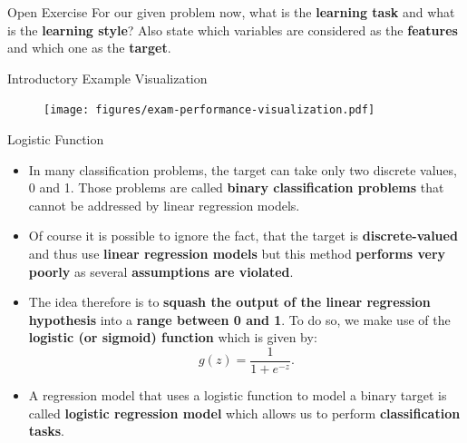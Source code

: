 \documentclass[main.tex]{subfiles}
\begin{document}
    \begin{frame}{Open Exercise }
        For our given problem now, what is the \textbf{learning task} and what is the \textbf{learning style}? Also state which variables are considered as the \textbf{features} and which one as the \textbf{target}.
        
    \end{frame}

    \begin{frame}{Introductory Example Visualization}
        \begin{figure}
            \label{fig:exam-performance-visualization}
            \texttt{[image: figures/exam-performance-visualization.pdf]}
        \end{figure}
    \end{frame}

	\begin{frame}{Logistic Function}
        \begin{itemize}
            \item In many classification problems, the target can take only two discrete values, 0 and 1. Those problems are called \textbf{binary classification problems} that cannot be addressed by linear regression models.
            \item Of course it is possible to ignore the fact, that the target is \textbf{discrete-valued} and thus use \textbf{linear regression models} but this method \textbf{performs very poorly} as several \textbf{assumptions are violated}.
            \item The idea therefore is to \textbf{squash the output of the linear regression hypothesis} into a \textbf{range between 0 and 1}. To do so, we make use of the \textbf{logistic (or sigmoid) function} which is given by:
            $$g(z) = \frac{1}{1 + e^{-z}}.$$
            \item A regression model that uses a logistic function to model a binary target is called \textbf{logistic regression model} which allows us to perform \textbf{classification tasks}.
        \end{itemize}
    \end{frame}
\end{document}

